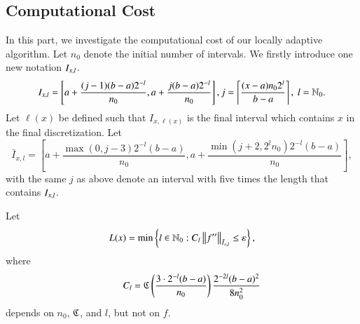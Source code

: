 \subsection{Computational Cost}

In this part, we investigate the computational cost of our locally adaptive algorithm. Let $n_0$ denote the initial number of intervals. We firstly introduce one new notation $\Ixl$.
\[\Ixl=\left[a+\frac{(j-1)(b-a)2^{-l}}{n_0},a+\frac{j(b-a)2^{-l}}{n_0}\right], j=\left\lceil\frac{(x-a)n_02^l}{b-a}\right\rceil, \ l = \mathbb{N}_0.\]
Let
$\ell(x)$ be defined such that
$I_{x,\ell(x)}$ is the final interval which contains $x$ in the final discretization.
Let
\[\bar{I}_{x,l}=\left[a+\frac{\max(0,j-3)2^{-l}(b-a)}{n_0}, a+ \frac{\min(j+2,2^ln_0)2^{-l}(b-a)}{n_0}\right],
\] with the same $j$ as above denote an interval with five times the length that contains $\Ixl$.

Let
\begin{equation}\label{eqn:defoflx}
L(x) = \min \left\{ l \in \natzero : C_l  \norm[\bar{I}_{x,l}]{f''} \le \varepsilon\right\},
\end{equation}
where
\[\qquad C_l=\fC\left(\frac{3\cdot2^{-l}(b-a)}{n_0}\right) \frac{2^{-2l}(b-a)^2}{8n^2_0}
\]
depends on $n_0$, $\fC$, and $l$, but not on $f$.

